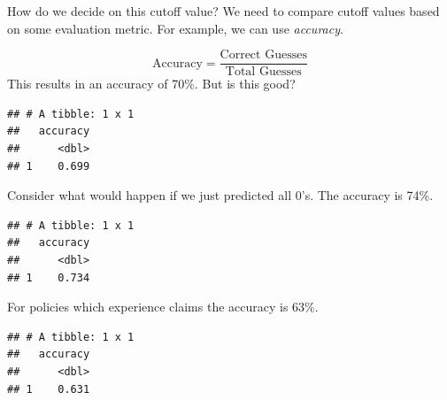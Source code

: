 \documentclass[]{book}
\newenvironment{Shaded}{\begin{snugshade}}{\end{snugshade}}
\newcommand{\DataTypeTok}[1]{\textcolor[rgb]{0.13,0.29,0.53}{#1}}
\newcommand{\DecValTok}[1]{\textcolor[rgb]{0.00,0.00,0.81}{#1}}
\newcommand{\KeywordTok}[1]{\textcolor[rgb]{0.13,0.29,0.53}{\textbf{#1}}}
\newcommand{\NormalTok}[1]{#1}
\newcommand{\OperatorTok}[1]{\textcolor[rgb]{0.81,0.36,0.00}{\textbf{#1}}}
\newcommand{\StringTok}[1]{\textcolor[rgb]{0.31,0.60,0.02}{#1}}
\begin{document}
How do we decide on this cutoff value? We need to compare cutoff values based on some evaluation metric. For example, we can use \emph{accuracy}.

\[\text{Accuracy} = \frac{\text{Correct Guesses}}{\text{Total Guesses}}\]
This results in an accuracy of 70\%. But is this good?

\begin{Shaded}
\end{Shaded}

\begin{verbatim}
## # A tibble: 1 x 1
##   accuracy
##      <dbl>
## 1    0.699
\end{verbatim}

Consider what would happen if we just predicted all 0's. The accuracy is 74\%.

\begin{Shaded}
\end{Shaded}

\begin{verbatim}
## # A tibble: 1 x 1
##   accuracy
##      <dbl>
## 1    0.734
\end{verbatim}

For policies which experience claims the accuracy is 63\%.

\begin{Shaded}
\end{Shaded}

\begin{verbatim}
## # A tibble: 1 x 1
##   accuracy
##      <dbl>
## 1    0.631
\end{verbatim}
\end{document}
